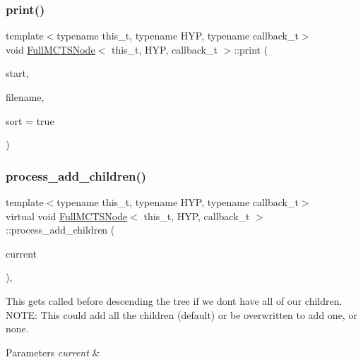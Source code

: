 \subsubsection{\texorpdfstring{print()}{print()}\hspace{0.1cm}{\footnotesize\ttfamily [3/3]}}
{\footnotesize\ttfamily template$<$typename this\+\_\+t, typename H\+YP, typename callback\+\_\+t$>$ \\
void \hyperlink{class_full_m_c_t_s_node}{Full\+M\+C\+T\+S\+Node}$<$ this\+\_\+t, H\+YP, callback\+\_\+t $>$\+::print (\begin{DoxyParamCaption}\item[{H\+YP \&}]{start,  }\item[{const char $\ast$}]{filename,  }\item[{const bool}]{sort = {\ttfamily true} }\end{DoxyParamCaption})\hspace{0.3cm}{\ttfamily [inline]}}

\mbox{\label{class_full_m_c_t_s_node_a10a7bbaae53e6b6ed71207ec80c1a620}} 
\subsubsection{\texorpdfstring{process\+\_\+add\+\_\+children()}{process\_add\_children()}}
{\footnotesize\ttfamily template$<$typename this\+\_\+t, typename H\+YP, typename callback\+\_\+t$>$ \\
virtual void \hyperlink{class_full_m_c_t_s_node}{Full\+M\+C\+T\+S\+Node}$<$ this\+\_\+t, H\+YP, callback\+\_\+t $>$\+::process\+\_\+add\+\_\+children (\begin{DoxyParamCaption}\item[{H\+YP \&}]{current }\end{DoxyParamCaption})\hspace{0.3cm}{\ttfamily [inline]}, {\ttfamily [virtual]}}



This gets called before descending the tree if we don\textquotesingle{}t have all of our children. N\+O\+TE\+: This could add all the children (default) or be overwritten to add one, or none. 


\begin{DoxyParams}{Parameters}
{\em current} & \\
\hline
\end{DoxyParams}
\mbox{\label{class_full_m_c_t_s_node_adc180cfd25b033b13ac048270fb51be7}} 

